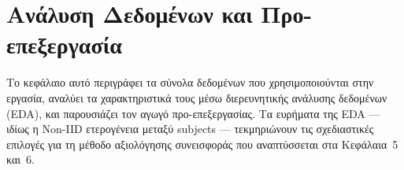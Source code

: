
\chapter{Ανάλυση Δεδομένων και Προ-επεξεργασία}
\label{ch:data_analysis}

Το κεφάλαιο αυτό περιγράφει τα σύνολα δεδομένων που χρησιμοποιούνται στην εργασία, αναλύει τα χαρακτηριστικά τους μέσω διερευνητικής ανάλυσης δεδομένων (EDA), και παρουσιάζει τον αγωγό προ-επεξεργασίας. Τα ευρήματα της EDA — ιδίως η Non-IID ετερογένεια μεταξύ subjects — τεκμηριώνουν τις σχεδιαστικές επιλογές για τη μέθοδο αξιολόγησης συνεισφοράς που αναπτύσσεται στα Κεφάλαια~5 και~6.




